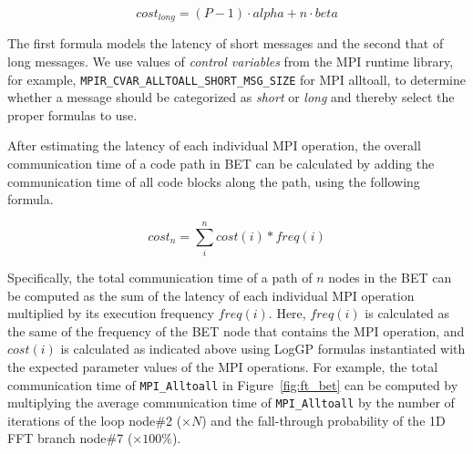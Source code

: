 \begin{equation}
cost_{long} = (P-1)\cdot alpha + n\cdot beta
\end{equation}

The first formula models the latency of short messages and
the second that of long messages.  We use values of \emph{control
  variables} from the MPI runtime library, for example,
\texttt{MPIR\_CVAR\_ALLTOALL\_SHORT\_MSG\_SIZE} for MPI alltoall, to
determine whether a message should be categorized as {\em short} or
{\em long} and thereby select the proper formulas to use.

After estimating the latency of each individual MPI operation,
the overall communication time of a code path in BET can be calculated
by adding the communication time of all code blocks along the path,
using the following formula.

\begin{equation}
  cost_{n} = \sum\limits_{i}^{n} cost(i) * freq(i)
\end{equation}

Specifically, the total communication time of a path of $n$ nodes in
the BET can be computed as the sum of the latency of each
individual MPI operation multiplied by its execution frequency
$freq(i)$.  Here, $freq(i)$ is calculated as the same of the frequency of the BET node that contains the MPI operation, and
$cost(i)$ is calculated as indicated above using LogGP formulas
instantiated with the expected parameter values of the MPI operations.
For example, the total communication time of \texttt{MPI\_Alltoall} in
Figure~\ref{fig:ft_bet} can be computed by multiplying the average
communication time of \texttt{MPI\_Alltoall} by the number of
iterations of the loop node\#2 ($\times N$) and the fall-through
probability of the 1D FFT branch node\#7 ($\times 100\%$).
